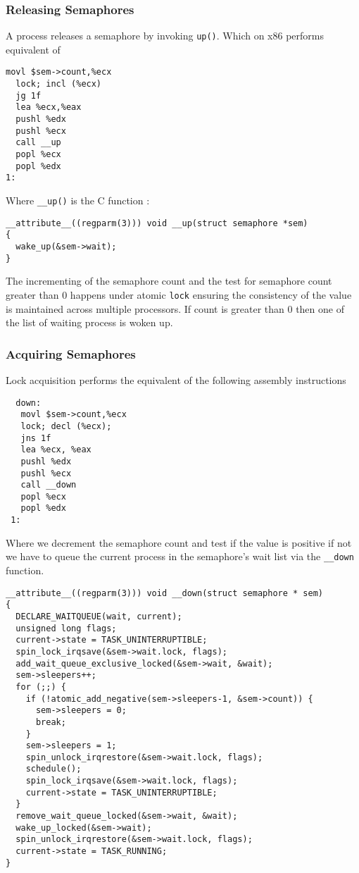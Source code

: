 \documentclass{article}
\begin{document}

\subsubsection{Releasing Semaphores}

A process releases a semaphore by invoking \lstinline{up()}. Which on
x86 performs equivalent of

\begin{lstlisting}[language=anX86]
  movl $sem->count,%ecx
  lock; incl (%ecx)
  jg 1f
  lea %ecx,%eax
  pushl %edx
  pushl %ecx
  call __up
  popl %ecx
  popl %edx
1:
\end{lstlisting}

Where \lstinline{__up()} is the C function :

\begin{lstlisting}
__attribute__((regparm(3))) void __up(struct semaphore *sem)
{
  wake_up(&sem->wait);
}  
\end{lstlisting}

The incrementing of the semaphore count and the test for semaphore
count greater than 0 happens under atomic \lstinline{lock} ensuring
the consistency of the value is maintained across multiple
processors. If count is greater than 0 then one of the list of waiting
process is woken up.

\subsubsection{Acquiring Semaphores}

Lock acquisition performs the equivalent of the following assembly
instructions

\begin{lstlisting}
  down:
   movl $sem->count,%ecx
   lock; decl (%ecx);
   jns 1f
   lea %ecx, %eax
   pushl %edx
   pushl %ecx
   call __down
   popl %ecx
   popl %edx
 1:
\end{lstlisting}

Where we decrement the semaphore count and test if the value is
positive if not we have to queue the current process in the
semaphore's wait list via the \lstinline{__down} function.

\begin{lstlisting}
__attribute__((regparm(3))) void __down(struct semaphore * sem)
{
  DECLARE_WAITQUEUE(wait, current);
  unsigned long flags;
  current->state = TASK_UNINTERRUPTIBLE;
  spin_lock_irqsave(&sem->wait.lock, flags);
  add_wait_queue_exclusive_locked(&sem->wait, &wait);
  sem->sleepers++;
  for (;;) {
    if (!atomic_add_negative(sem->sleepers-1, &sem->count)) {
      sem->sleepers = 0;
      break;
    }
    sem->sleepers = 1;
    spin_unlock_irqrestore(&sem->wait.lock, flags);
    schedule();
    spin_lock_irqsave(&sem->wait.lock, flags);
    current->state = TASK_UNINTERRUPTIBLE;
  }
  remove_wait_queue_locked(&sem->wait, &wait);
  wake_up_locked(&sem->wait);
  spin_unlock_irqrestore(&sem->wait.lock, flags);
  current->state = TASK_RUNNING;
}
\end{lstlisting}
\end{document}
